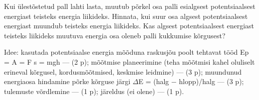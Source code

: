 
Kui ülestõstetud pall lahti lasta, muutub põrkel osa palli esialgsest potentsiaalsest energiast teisteks energia liikideks. Hinnata, kui suur osa algsest potentsiaalsest energiast muundub teisteks energia liikideks. Kas algsest potentsiaalsest energiast teisteks liikideks muutuva energia osa oleneb palli kukkumise kõrgusest?

\hint

\solu
Idee: kasutada potentsiaalse energia mõõduna raskusjõu poolt tehtavat tööd Ep = A = F s = mgh --- (2 p); mõõtmise planeerimine (teha mõõtmisi kahel oluliselt erineval kõrgusel, kordusmõõtmised, keskmise leidmine) --- (3 p); muundunud energiaosa hindamine põrke kõrguse järgi $\Delta$E = (halg $-$ hlopp)/halg --- (3 p); tulemuste võrdlemine --- (1 p); järeldus (ei olene) --- (1 p).
\probend
